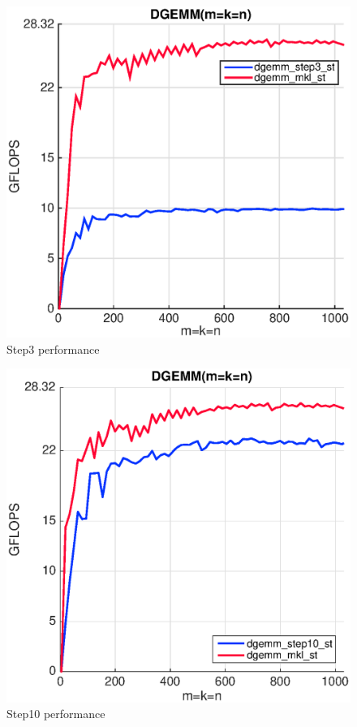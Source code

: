 \begin{figure}[!htp]
  \centering
  \includegraphics[scale=.5]{figures/step3_single_thread_ivy.eps}
  \caption{Step3 performance}
  \label{fig:packing}
\end{figure} 

\begin{figure}[!htp]
  \centering
  \includegraphics[scale=.5]{figures/step10_single_thread_ivy.eps}
  \caption{Step10 performance}
  \label{fig:int}
\end{figure} 

